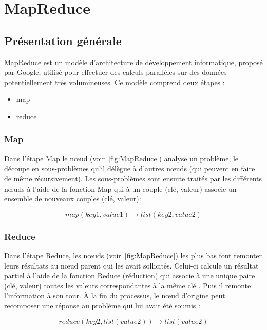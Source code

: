 \section{MapReduce}

\subsection{Présentation générale}

MapReduce est un modèle d'architecture de développement informatique, proposé par Google, utilisé pour effectuer des calculs parallèles sur des données potentiellement très volumineuses.
Ce modèle comprend deux étapes :
\begin{itemize}
	\item map
	\item reduce
\end{itemize}

\subsubsection{Map}

Dans l'étape Map le nœud (voir~\autoref{fig:MapReduce}) analyse un problème, le découpe en sous-problèmes qu'il délègue à d'autres nœuds (qui peuvent en faire de même récursivement).
Les sous-problèmes sont ensuite traités par les différents nœuds à l'aide de la fonction Map qui à un couple (clé, valeur) associe un ensemble de nouveaux couples (clé, valeur):

\begin{equation}
map(key1,value1) → list(key2,value2)
\end{equation}

\subsubsection{Reduce}

Dans l'étape Reduce, les nœuds (voir~\autoref{fig:MapReduce}) les plus bas font remonter leurs résultats au nœud parent qui les avait sollicités.
Celui-ci calcule un résultat partiel à l'aide de la fonction Reduce (réduction) qui associe à une unique paire (clé, valeur) toutes les valeurs correspondantes à la même clé .
Puis il remonte l'information à son tour.
À la fin du processus, le nœud d'origine peut recomposer une réponse au problème qui lui avait été soumis :

\begin{equation}
reduce(key2,list(value2))→ list(value2)
\end{equation}

